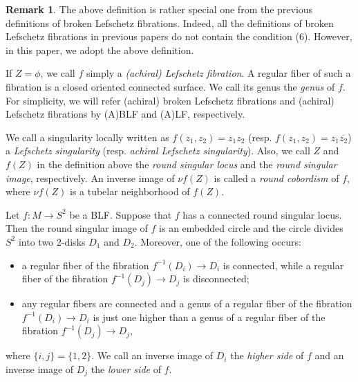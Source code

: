 \documentclass{amsart}
\theoremstyle{plain}
\theoremstyle{definition}
\newtheorem{rem}[thm]{Remark}
\begin{document}
\begin{rem}

The above definition is rather special one from the previous definitions of broken Lefschetz fibrations. 
Indeed, all the definitions of broken Lefschetz fibrations in previous papers do not contain the condition (6). 
However, in this paper, we adopt the above definition. 

\end{rem}


If $Z=\phi$, we call $f$ simply a {\it (achiral) Lefschetz fibration}. 
A regular fiber of such a fibration is a closed oriented connected surface. 
We call its genus the {\it genus} of $f$. 
For simplicity, we will refer (achiral) broken Lefschetz fibrations and (achiral) Lefschetz fibrations by (A)BLF and (A)LF, respectively. 

\par

We call a singularity locally written as $f(z_1,z_2)=z_1z_2$ (resp. $f(z_1,z_2)=z_1\overline{z_2}$) a {\it Lefschetz singularity} (resp. {\it achiral Lefschetz singularity}). 
Also, we call $Z$ and $f(Z)$ in the definition above the {\it round singular locus} and the {\it round singular image}, respectively. 
An inverse image of $\nu f(Z)$ is called a {\it round cobordism} of $f$, where $\nu f(Z)$ is a tubelar neighborhood of $f(Z)$. 

\par

Let $f:M\rightarrow S^2$ be a BLF. 
Suppose that $f$ has a connected round singular locus. 
Then the round singular image of $f$ is an embedded circle and the circle divides $S^2$ into two $2$-disks $D_1$ and $D_2$. 
Moreover, one of the following occurs: 

\begin{itemize}

\item a regular fiber of the fibration $f^{-1}(D_i)\rightarrow D_i$ is connected, while a regular fiber of the fibration $f^{-1}(D_j)\rightarrow D_j$ is disconnected; 

\item any regular fibers are connected and a genus of a regular fiber of the fibration $f^{-1}(D_i)\rightarrow D_i$ is just one higher than a genus of a regular fiber of the fibration $f^{-1}(D_j)\rightarrow D_j$, 

\end{itemize}
where $\{i,j\}=\{1,2\}$. 
We call an inverse image of $D_i$ the {\it higher side} of $f$ and an inverse image of $D_j$ the {\it lower side} of $f$. 
\end{document}
